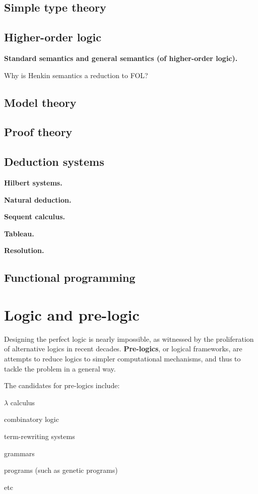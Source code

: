 \subsection{Simple type theory}

\subsection{Higher-order logic}

\textbf{Standard semantics and general semantics (of higher-order logic).}

Why is Henkin semantics a reduction to FOL?

\subsection{Model theory}

\subsection{Proof theory}

\subsection{Deduction systems}

\textbf{Hilbert systems.}

\textbf{Natural deduction.}

\textbf{Sequent calculus.}

\textbf{Tableau.}

\textbf{Resolution.}

\subsection{Functional programming}

\section{Logic and pre-logic}

Designing the perfect logic is nearly impossible, as witnessed by the proliferation of alternative logics in recent decades.  \textbf{Pre-logics}, or logical frameworks, are attempts to reduce logics to simpler computational mechanisms, and thus to tackle the problem in a general way.

The candidates for pre-logics include:
\begin{compactenum}[\textbullet ]
\item $\lambda$ calculus
\item combinatory logic
\item term-rewriting systems
\item grammars
\item programs (such as genetic programs)
\item etc
\end{compactenum}

